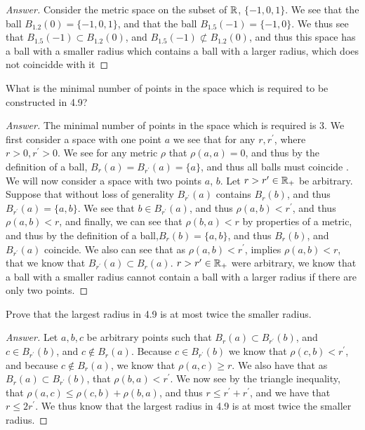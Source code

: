 \begin{proof}[Answer]
  Consider the metric space on the subset of $\mathbb{R}$, $\{-1,0,1\}$. We
  see that the ball $B_{1.2}(0) = \{-1,0,1\}$, and that the ball 
  $B_{1.5}(-1)=\{-1,0\}$. We thus see that $B_{1.5}(-1) \subset
  B_{1.2}(0)$, and $B_{1.5}(-1) \not\subset B_{1.2}(0)$, and thus this
  space has a ball with a smaller radius which contains a ball with a
  larger radius, which does not coincidde with it
\end{proof}

\begin{minorEx}%
    What is the minimal number of points in the space which is required to be
    constructed in 4.9?
\end{minorEx}

\begin{proof}[Answer]
  The minimal number of points in the space which is required is
  $3$. We first consider a space with one point $a$ we see that for
  any $r,r^\prime$, where $r > 0,r^\prime > 0$. We see for any metric
  $\rho$ that $\rho(a,a)=0$, and thus by the
  definition of a ball, $B_r(a)= B_{r^\prime}(a)=\{a\}$, and thus all
  balls must coincide . We will now consider a space with two
  points $a$, $b$. Let $r>r^\prime\in \mathbb{R}_+$ be arbitrary. Suppose
  that without loss of generality $B_{r^\prime}(a)$ contains $B_{r}(b)$, and thus
  $B_{r^\prime}(a)=\{a,b\}$.
 We see that $b\in
  B_{r^\prime}(a)$, and thus $\rho(a,b)<r^\prime$, and thus
  $\rho(a,b)<r$, and finally, we can see that $\rho(b,a)<r$ by
  properties of a metric, and thus by the definition of a
  ball,$B_{r}(b)=\{a,b\}$, and thus $B_{r}(b)$, and $B_{r^\prime}(a)$
  coincide. We also can see that as
  $\rho(a,b)<r^\prime$, implies $\rho(a,b)<r$, that we know that
  $ B_{r^\prime}(a) \subset B_{r}(a)$. $r>r^\prime\in \mathbb{R}_+$ were
  arbitrary, we know that a ball with a smaller radius cannot contain
  a ball with a larger radius if there are only two points.
\end{proof}

\begin{minorEx}%
    Prove that the largest radius in 4.9 is at most twice the smaller radius.
\end{minorEx}

\begin{proof}[Answer]
  Let $a,b,c$ be arbitrary points such that $B_r(a) \subset B_{r^\prime}(b)$,
  and $c \in B_{r^\prime}(b)$, and $c \notin
  B_r(a)$. Because $c \in B_{r^\prime}(b)$ we know that 
  $\rho(c,b)<r^\prime$, and because
  $c \notin  B_r(a)$, we know that $\rho(a,c)\geq r$. We also have
  that as $B_r(a) \subset B_{r^\prime}(b)$, that
  $\rho(b,a)<r^\prime$. We now see by the triangle inequality, that 
  $\rho(a,c) \leq \rho(c,b)+ \rho(b,a)$, and thus 
  $r \leq r^\prime +r^\prime$, and we have that $r\leq 2r^\prime$. We
  thus know that the largest radius in 4.9 is at most twice the
  smaller radius.
\end{proof}
